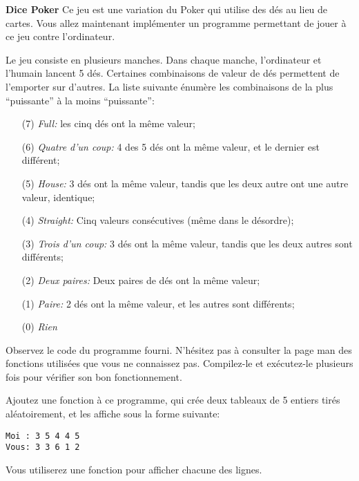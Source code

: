 \documentclass[10pt]{article}\usepackage[nu]{esial}
\begin{document}
\begin{Exercice}\textbf{Dice Poker}
  Ce jeu est une variation du Poker qui utilise des dés au lieu de cartes. Vous
  allez maintenant implémenter un programme permettant de jouer à ce jeu contre
  l'ordinateur.

  Le jeu consiste en plusieurs manches. Dans chaque manche, l'ordinateur et
  l'humain lancent 5 dés. Certaines combinaisons de valeur de dés permettent de
  l'emporter sur d'autres. La liste suivante énumère les combinaisons de la
  plus ``puissante'' à la moins ``puissante'':
  \begin{itemize}
  \item[(7)] \textit{Full:} les cinq dés ont la même valeur;
  \item[(6)] \textit{Quatre d'un coup:} 4 des 5 dés ont la même valeur, et le
    dernier est différent;
  \item[(5)] \textit{House:} 3 dés ont la même valeur, tandis que les deux
    autre ont une autre valeur, identique;
  \item[(4)] \textit{Straight:} Cinq valeurs consécutives (même dans le
    désordre);
  \item[(3)] \textit{Trois d'un coup:} 3 dés ont la même valeur, tandis que les
    deux autres sont différents;
  \item[(2)] \textit{Deux paires:} Deux paires de dés ont la même valeur;
  \item[(1)] \textit{Paire:} 2 dés ont la même valeur, et les autres sont
    différents;
  \item[(0)] \textit{Rien}
  \end{itemize}
  
  \Question Observez le code du programme  fourni.
  N'hésitez pas à consulter la page man des fonctions utilisées que vous ne
  connaissez pas. Compilez-le et exécutez-le plusieurs fois pour vérifier son
  bon fonctionnement.

  \noindent\begin{minipage}{.77\linewidth}
    \Question Ajoutez une fonction  à ce programme, qui crée
    deux tableaux de 5 entiers tirés aléatoirement, et les affiche sous la
    forme suivante:
  \end{minipage}\hfill\begin{minipage}{.19\linewidth}
    \begin{Verbatim}
Moi : 3 5 4 4 5
Vous: 3 3 6 1 2
    \end{Verbatim}
  \end{minipage}
  Vous utiliserez une fonction  pour
  afficher chacune des lignes. 


\end{Exercice}
\end{document}
